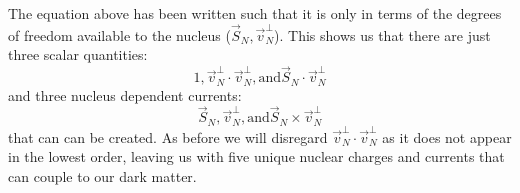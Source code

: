 The equation above has been written such that it is only in terms of the degrees of freedom available to the nucleus ($\vec{S}_{N},\vec{v}^{\perp}_{N}$).
This shows us that there are just three scalar quantities: 
\begin{equation}
    1, \vec{v}^{\perp}_{N} \cdot \vec{v}^{\perp}_{N}, \text{and} \vec{S}_{N} \cdot \vec{v}^{\perp}_{N}
\end{equation}
and three nucleus dependent currents:
\begin{equation}
    \vec{S}_{N}, \vec{v}^{\perp}_{N}, \text{and} \vec{S}_{N} \times \vec{v}^{\perp}_{N}
\end{equation}
that can can be created.
As before we will disregard $\vec{v}^{\perp}_{N} \cdot \vec{v}^{\perp}_{N}$ as it does not appear in the lowest order, leaving us with five unique nuclear charges and currents that can couple to our dark matter.

